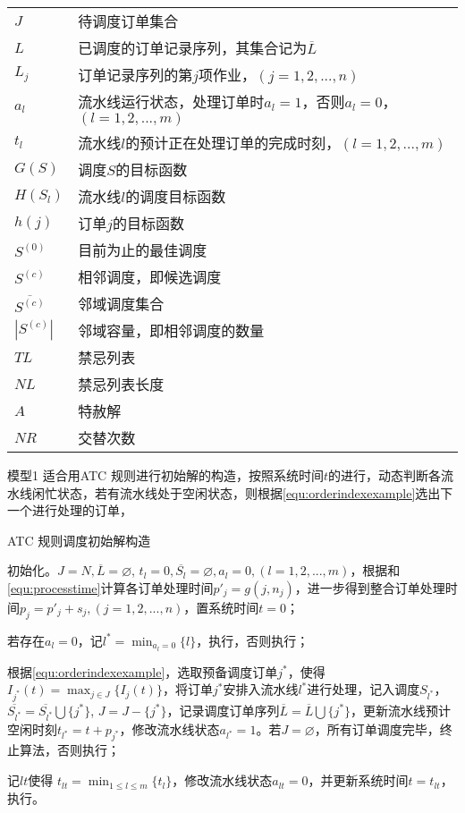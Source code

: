 \begin{supertabular}{ll}
$J$ & 待调度订单集合\\
$L$ & 已调度的订单记录序列，其集合记为$\overline{L}$\\
$L_j$ & 订单记录序列的第$j$项作业，$(j = 1,2,...,n)$\\
$a_l$ & 流水线运行状态，处理订单时$a_l = 1$，否则$a_l = 0$，$(l = 1,2,...,m)$\\
$t_l$ & 流水线$l$的预计正在处理订单的完成时刻，$(l = 1,2,...,m)$\\
$G(S)$& 调度$S$的目标函数\\
$H(S_l)$ & 流水线$l$的调度目标函数\\
$h(j)$ & 订单$j$的目标函数\\
$S^{(0)}$ & 目前为止的最佳调度\\
$S^{(c)}$& 相邻调度，即候选调度\\
$\overline{S^{(c)}}$& 邻域调度集合\\
$|S^{(c)}|$& 邻域容量，即相邻调度的数量\\
$TL$ & 禁忌列表\\
$NL$ &禁忌列表长度\\
$A$ & 特赦解\\
$NR$ &交替次数\\
\end{supertabular}

模型1 适合用ATC 规则进行初始解的构造，按照系统时间$t$的进行，动态判断各流水线闲忙状态，若有流水线处于空闲状态，则根据\eqref{equ:orderindexexample}选出下一个进行处理的订单，
\begin{algori}
ATC 规则调度初始解构造\label{alg:basicconstruct}

\begin{asparaenum}
\renewcommand{\labelenumi}{\bf Step\theenumi~}
\item 初始化。$J = N, \overline{L} = \varnothing$, $t_l = 0, \overline{S_l} = \varnothing, a_l=0, (l = 1,2,...,m)$，根据和\eqref{equ:processtime}计算各订单处理时间$p'_j = g(j, n_j)$，进一步得到整合订单处理时间$p_j = p'_j + s_j, (j = 1,2,...,n)$，置系统时间$t = 0$；
\item 若存在$a_l = 0$，记$l^* = \displaystyle\min_{a_l = 0}\{l\}$，执行，否则执行；
\item 根据\eqref{equ:orderindexexample}，选取预备调度订单$j^*$，使得$I_{j^*}(t) = \displaystyle\max_{j\in J}\{I_j(t)\}$，将订单$j^*$安排入流水线$l^*$进行处理，记入调度$S_{l^*}$，$\overline{S_{l^*}}=\overline{S_{l^*}}\bigcup \{j^*\}$, $J = J -\{j^*\}$，记录调度订单序列$\overline{L} = \overline{L} \bigcup \{j^*\}$，更新流水线预计空闲时刻$t_{l^*} = t + p_{j^*}$，修改流水线状态$a_{l^*} = 1$。若$J = \varnothing$，所有订单调度完毕，终止算法，否则执行；
\item 记$lt$使得 $t_{lt} = \displaystyle\min_{1\le l\le m}\{t_l\}$，修改流水线状态$a_{lt} = 0$，并更新系统时间$t = t_{lt}$，执行。
\end{asparaenum}
\end{algori}

